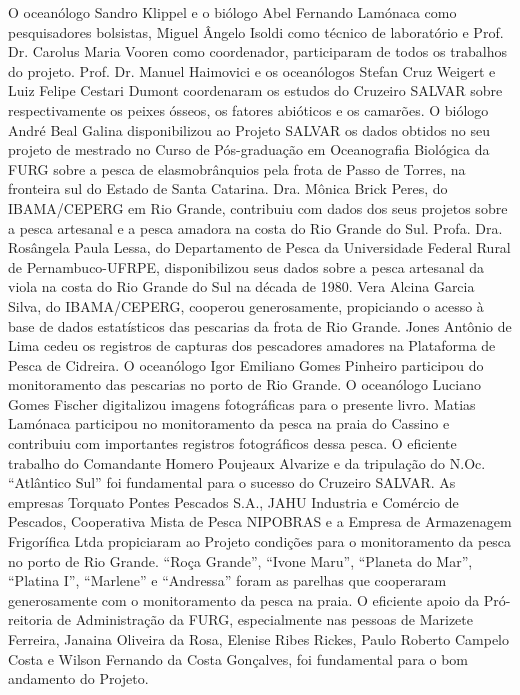 \documentclass[a4paper,11pt,twoside,showtrims,onecolumn,openright,final]{memoir}
\begin{document}
O oceanólogo Sandro Klippel e o biólogo Abel Fernando Lamónaca como pesquisadores bolsistas, 
Miguel Ângelo Isoldi como técnico de laboratório e Prof. Dr. Carolus Maria Vooren como coordenador, 
participaram de todos os trabalhos do projeto. Prof. Dr. Manuel Haimovici e os 
oceanólogos Stefan Cruz Weigert e Luiz Felipe Cestari Dumont coordenaram os estudos 
do Cruzeiro SALVAR sobre respectivamente os peixes ósseos, os fatores abióticos e os camarões. 
O biólogo André Beal Galina disponibilizou ao Projeto SALVAR os dados obtidos no seu projeto 
de mestrado no Curso de Pós-graduação em Oceanografia Biológica da FURG sobre a pesca de elasmobrânquios 
pela frota de Passo de Torres, na fronteira sul do Estado de Santa Catarina. 
Dra. Mônica Brick Peres, do IBAMA/CEPERG em Rio Grande, contribuiu com dados dos seus projetos 
sobre a pesca artesanal e a pesca amadora na costa do Rio Grande do Sul. 
Profa. Dra. Rosângela Paula Lessa, do Departamento de Pesca da Universidade Federal Rural 
de Pernambuco-UFRPE, disponibilizou seus dados sobre a pesca artesanal da viola na costa 
do Rio Grande do Sul na década de 1980. Vera Alcina Garcia Silva, do IBAMA/CEPERG, cooperou generosamente, 
propiciando o acesso à base de dados estatísticos das pescarias da frota de Rio Grande. 
Jones Antônio de Lima cedeu os registros de capturas dos pescadores amadores na Plataforma
de Pesca de Cidreira.
O oceanólogo Igor Emiliano Gomes Pinheiro participou do monitoramento das pescarias no porto de Rio Grande. 
O oceanólogo Luciano Gomes Fischer digitalizou imagens fotográficas para o presente livro. 
Matias Lamónaca participou no monitoramento da pesca na praia do Cassino e contribuiu com 
importantes registros fotográficos dessa pesca. O eficiente trabalho do Comandante Homero 
Poujeaux Alvarize e da tripulação do N.Oc. ``Atlântico Sul'' foi fundamental para o sucesso 
do Cruzeiro SALVAR. As empresas Torquato Pontes Pescados S.A., JAHU Industria e Comércio de Pescados, 
Cooperativa Mista de Pesca NIPOBRAS e a Empresa de Armazenagem Frigorífica Ltda 
propiciaram ao Projeto condições para o monitoramento da pesca no porto de Rio Grande. 
``Roça Grande'', ``Ivone Maru'', ``Planeta do Mar'', ``Platina I'', ``Marlene'' e ``Andressa'' 
foram as parelhas que cooperaram generosamente com o monitoramento da pesca na praia. 
O eficiente apoio da Pró-reitoria de Administração da FURG, especialmente nas pessoas 
de Marizete Ferreira, Janaina Oliveira da Rosa, Elenise Ribes Rickes, Paulo Roberto Campelo Costa 
e Wilson Fernando da Costa Gonçalves, foi fundamental para o bom andamento do Projeto. 
\end{document}
